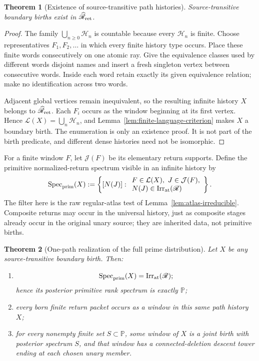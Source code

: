 \documentclass[11pt]{article}
\newtheorem{theorem}{Theorem}[section]
\begin{document}
\begin{theorem}[Existence of source-transitive path histories]
\label{thm:transitive-existence}
Source-transitive boundary births exist in
\(\widehat{\mathscr R}_{\rm ret}\).
\end{theorem}

\begin{proof}
The family \(\bigcup_{n\ge0}\mathscr H_n\) is countable because every
\(\mathscr H_n\) is finite.  Choose representatives
\(F_1,F_2,\ldots\) in which every finite history type occurs.  Place these
finite words consecutively on one atomic ray.  Give the equivalence classes
used by different words disjoint names and insert a fresh singleton vertex
between consecutive words.  Inside each word retain exactly its given
equivalence relation; make no identification across two words.

Adjacent global vertices remain inequivalent, so the resulting infinite
history \(X\) belongs to \(\widehat{\mathscr R}_{\rm ret}\).  Each \(F_i\)
occurs as the window beginning at its first vertex.  Hence
\(\mathcal L(X)=\bigcup_n\mathscr H_n\), and
Lemma~\ref{lem:finite-language-criterion} makes \(X\) a boundary birth.
The enumeration is only an existence proof.  It is not part of the birth
predicate, and different dense histories need not be isomorphic.
\end{proof}

For a finite window \(F\), let \(\mathcal J(F)\) be its elementary return
supports.  Define the primitive normalized-return spectrum visible in an
infinite history by
\[
\operatorname{Spec}_{\rm prim}(X)
:=
\left\{
[N(J)]:
\begin{array}{l}
F\in\mathcal L(X),\ J\in\mathcal J(F),\\
N(J)\in\operatorname{Irr}_{\rm at}(\mathscr R)
\end{array}
\right\}.
\]
The filter here is the raw regular-atlas test of
Lemma~\ref{lem:atlas-irreducible}.  Composite returns may occur in the
universal history, just as composite stages already occur in the original
unary source; they are inherited data, not primitive births.

\begin{theorem}[One-path realization of the full prime distribution]
\label{thm:all-prime-return}
Let \(X\) be any source-transitive boundary birth.  Then:
\begin{enumerate}[label=(\roman*)]
\item
\[
\operatorname{Spec}_{\rm prim}(X)
=
\operatorname{Irr}_{\rm at}(\mathscr R);
\]
hence its posterior primitive rank spectrum is exactly \(\mathbb P\);
\item every born finite return packet occurs as a window in this same path
history \(X\);
\item for every nonempty finite set \(S\subset\mathbb P\), some window of
\(X\) is a joint birth with posterior spectrum \(S\), and that window has a
connected-deletion descent tower ending at each chosen unary member.
\end{enumerate}
\end{theorem}
\end{document}
